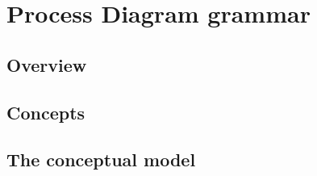\chapter{Process Diagram grammar}
\label{chp:af:grammar}

\section{Overview}

\section{Concepts}

\section{The conceptual model}





